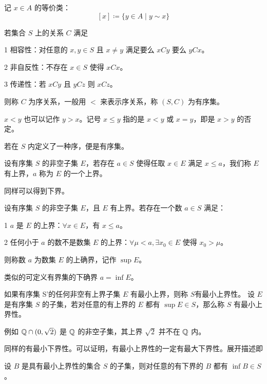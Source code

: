 记 $x\in A$ 的等价类：
$$[x] \coloneqq  \{y \in A \mid y \sim x\}$$ 

\begin{definition}[序关系]
	若集合 $S$ 上的关系 $C$ 满足

	\num{1} 相容性：对任意的 $x,y\in S$ 且 $x\ne y$ 满足要么 $xCy$ 要么 $yCx$。
	
	\num{2} 非自反性：不存在 $x\in S$ 使得 $xCx$。

	\num{3} 传递性：若 $xCy$ 且 $yCz$ 则 $xCz$。

	则称 $C$ 为序关系，一般用 $<$ 来表示序关系，称 $(S,C)$ 为有序集。
\end{definition}

$x<y$ 也可以记作 $y>x$。记号 $x\leqslant y$ 指的是 $x<y$ 或 $x=y$，即是 $x>y$ 的否定。

若在 $S$ 内定义了一种序，便是有序集。

\begin{definition}[上界]
	设有序集 $S$ 的非空子集 $E$，若存在 $a \in S$ 使得任取 $x\in E$ 满足 $x \leqslant a$，我们称 $E$ 有上界，$a$ 称为 $E$ 的一个上界。 
\end{definition}

同样可以得到下界。

\begin{definition}[上确界]
	设有序集 $S$ 的非空子集 $E$，且 $E$ 有上界。若存在一个数 $a \in S$ 满足：
	
	\num{1} $a$ 是 $E$ 的上界：$\forall x\in E$，有 $x\leqslant a$。
	
	\num{2} 任何小于 $a$ 的数不是数集 $E$ 的上界：$\forall \mu<a, \exists x_0\in E$ 使得 $x_0>\mu$。
	
	则称数 $a$ 为数集 $E$ 的上确界，记作 $\sup E$。
\end{definition}

类似的可定义有界集的下确界 $a=\inf E$。

\begin{definition}[最小上界性]
	如果有序集 S'的任何非空有上界子集 $E$ 有最小上界，则称 $S$有最小上界性。
	设 $E$ 是有序集 $S$ 的子集，若对任意的有上界的 $E$ 都有 $\sup E \in S$，那么称 $S$ 有最小上界性。
\end{definition}

例如 $\mathbb{Q} \cap (0,\sqrt2)$ 是 $\mathbb{Q}$ 的非空子集，其上界 $\sqrt2$ 并不在 $\mathbb{Q}$ 内。

同样的有最小下界性。可以证明，有最小上界性的一定有最大下界性。展开描述即

\begin{theorem}
	设 $B$ 是具有最小上界性的集合 $S$ 的子集，则对任意的有下界的 $B$ 都有 $\inf B \in S$。
\end{theorem}

